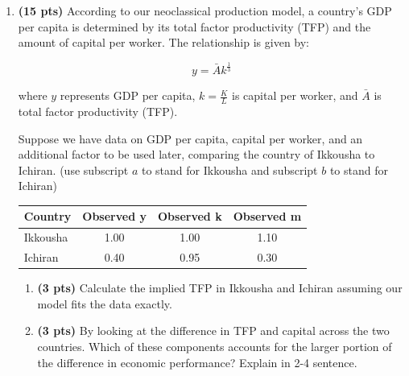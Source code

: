 \documentclass[14pt, oneside]{memoir}
\begin{document}
\begin{enumerate}[label=\textbf{\arabic*.}, itemsep=15pt]
\begin{enumerate}[label=(\alph*)]
\begin{enumerate}[label=(\roman*)]
		
	\end{enumerate}
	\clearpage
	\item Let both \(K\) and \(L\) be multiplied by a factor \(a\):
	\[
	F(A, aK, aL) = A +  (aK)^\alpha (aL)^\beta = A+ a^{\alpha + \beta}  K^\alpha L^\beta
	\]
	Compare it to 
	\[aF(A, K, L) = aA + a K^\alpha L^\beta \]
	
	If $\alpha$ and $\beta$ is between zero to one and $\alpha+\beta = 1$,  this function is not a constant return to scale function.
	
	When $A$ is also allow to change and that $\alpha + \beta = 1$,
	\[
	F(aA, aK, aL) = aA +  (aK)^\alpha (aL)^\beta = aA+ a^{\alpha + \beta}  K^\alpha L^\beta = aF(A, K, L)
	\]
\end{enumerate}	

\clearpage
\item  \textbf{(15 pts)}\label{P5} 
According to our neoclassical production model, a country’s GDP per capita is determined by its total factor productivity (TFP) and the amount of capital per worker. The relationship is given by:

\[
y = \bar{A} k^{\frac{1}{3}}
\]

where \( y \) represents GDP per capita, \( k = \frac{K}{L} \) is capital per worker, and \( \bar{A} \) is total factor productivity (TFP).

Suppose we have data on GDP per capita, capital per worker, and an additional factor to be used later, comparing the country of Ikkousha to Ichiran. (use subscript $a$ to stand for Ikkousha and subscript $b$ to stand for Ichiran)

\begin{table}[htbp]
	\centering
	\begin{tabular}{l|ccc}
		Country & Observed y & Observed k & Observed m \\
		\midrule
		Ikkousha & 1.00  & 1.00  & 1.10 \\
		Ichiran & 0.40  & 0.95  & 0.30 \\
		\bottomrule
	\end{tabular}%
	\label{tab:addlabel}%
\end{table}%

\begin{enumerate}[label=(\alph*)]
	\item \textbf{(3 pts)} 
	Calculate the implied TFP in Ikkousha and Ichiran assuming our model fits the data exactly.
	\clearpage
	\item \textbf{(3 pts)} 	
	By looking at the difference in TFP and capital across the two countries. Which of these components accounts for the larger portion of the difference in economic performance? Explain in 2-4 sentence.
	

\end{enumerate}
\end{enumerate}
\end{document}
